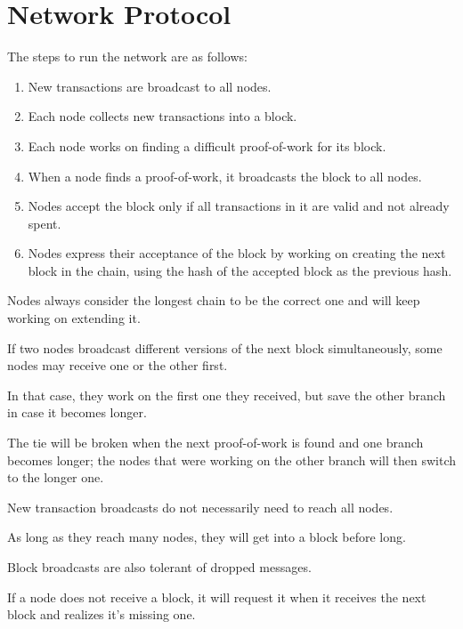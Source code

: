 \documentclass{article}
\begin{document}
\section{Network Protocol}

The steps to run the network are as follows:

\begin{enumerate}
\item New transactions are broadcast to all nodes.
\item Each node collects new transactions into a block.
\item Each node works on finding a difficult proof-of-work for its block.
\item When a node finds a proof-of-work, it broadcasts the block to all nodes.
\item Nodes accept the block only if all transactions in it are valid and not already spent.
\item Nodes express their acceptance of the block by working on creating the next block in the chain, using the hash of the accepted block as the previous hash.
\end{enumerate}

Nodes always consider the longest chain to be the correct one and will keep working on extending it.

If two nodes broadcast different versions of the next block simultaneously, some nodes may receive one or the other first.

In that case, they work on the first one they received, but save the other branch in case it becomes longer.

The tie will be broken when the next proof-of-work is found and one branch becomes longer; the nodes that were working on the other branch will then switch to the longer one.

New transaction broadcasts do not necessarily need to reach all nodes.

As long as they reach many nodes, they will get into a block before long.

Block broadcasts are also tolerant of dropped messages.

If a node does not receive a block, it will request it when it receives the next block and realizes it's missing one.
\end{document}
